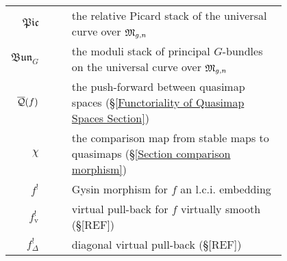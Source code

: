 \begin{longtabu}{r c c p{0.8\linewidth}}
$\mathfrak{Pic}$ & & & the relative Picard stack of the universal curve over $\mathfrak M_{g,n}$ \\
$\mathfrak{Bun}_{G}$ & & & the moduli stack of principal $G$-bundles on the universal curve over $\mathfrak M_{g,n}$ \\
$\overline{\mathcal{Q}}(f)$ & & & the push-forward between quasimap spaces (\S \ref{Functoriality of Quasimap Spaces Section}) \\
$\chi$ & & & the comparison map from stable maps to quasimaps (\S \ref{Section comparison morphism}) \\
$f^!$ & & & Gysin morphism for $f$ an l.c.i. embedding \\
$f^!_{\text{v}}$ & & & virtual pull-back for $f$ virtually smooth (\S [REF]) \\
$f^!_{\Delta}$ & & & diagonal virtual pull-back (\S [REF])
\end{longtabu}